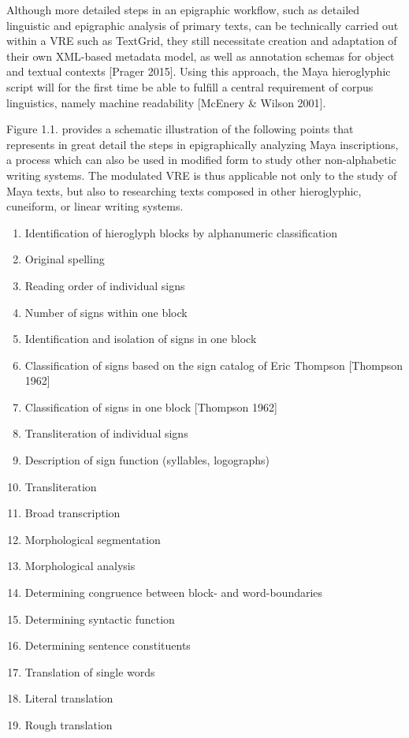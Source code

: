 \documentclass[amsthm,ebook]{saparticle}
\begin{document}
Although more detailed steps in an epigraphic workflow, such as detailed linguistic and epigraphic analysis of primary
texts, can be technically carried out within a VRE such as TextGrid, they still necessitate creation and adaptation of
their own XML-based metadata model, as well as annotation schemas for object and textual contexts [Prager 2015]. Using
this approach, the Maya hieroglyphic script will for the first time be able to fulfill a central requirement of corpus
linguistics, namely machine readability [McEnery \& Wilson 2001]. 

Figure 1.1. provides a schematic illustration of the following points that represents in great detail the steps in
epigraphically analyzing Maya inscriptions, a process which can also be used in modified form to study other
non-alphabetic writing systems. The modulated VRE is thus applicable not only to the study of Maya texts, but also to
researching texts composed in other hieroglyphic, cuneiform, or linear writing systems. 


\bigskip

\begin{enumerate}
\item Identification of hieroglyph blocks by alphanumeric classification 
\item Original spelling
\item Reading order of individual signs 
\item Number of signs within one block 
\item Identification and isolation of signs in one block 
\item Classification of signs based on the sign catalog of Eric Thompson [Thompson 1962]
\item Classification of signs in one block [Thompson 1962] 
\item Transliteration of individual signs 
\item Description of sign function (syllables, logographs)
\item Transliteration 
\item Broad transcription
\item Morphological segmentation 
\item Morphological analysis 
\item Determining congruence between block- and word-boundaries 
\item Determining syntactic function 
\item Determining sentence constituents 
\item Translation of single words 
\item Literal translation 
\item Rough translation \ 
\end{enumerate}
\end{document}
